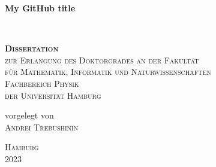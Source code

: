 
\begin{titlepage} %
\frontmatter


\vspace{2cm}
    \centering

	\vspace{0.4cm}
    \parbox[t]{0.96\textwidth}{\rmfamily \setlength\parfillskip{0pt} \def\baselinestretch{1.1}\centering\Huge \bfseries My GitHub title}\\
	\vspace{0.4cm}
    \vspace{2 cm} %
	
	
    \parbox[p]{0.95\textwidth}{\def\baselinestretch{1.4}\centering\scshape\textbf{\LARGE Dissertation} \\ {\large zur Erlangung des Doktorgrades an der Fakult{\"a}t\\ f{\"u}r Mathematik, Informatik und Naturwissenschaften \\ Fachbereich Physik \\ der Universit{\"a}t Hamburg} }
    
    \vspace{2 cm} %

    \parbox[b]{0.93\textwidth}{\def\baselinestretch{1.3}\centering\upshape \large vorgelegt von \\ {\LARGE\scshape  Andrei Trebushinin} \\ %
    }
    
    \vspace{2 cm} %
    
    \parbox[b]{0.93\textwidth}{\def\baselinestretch{1.3}\centering \large\scshape Hamburg\\\scshape 2023}

\end{titlepage}

